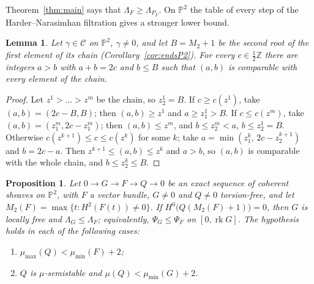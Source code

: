 \documentclass[11pt]{amsart}
\newtheorem{proposition}[theorem]{Proposition}
\newtheorem{lemma}[theorem]{Lemma}
\theoremstyle{definition}
\theoremstyle{remark}
\newcommand{\PP}{\mathbb{P}}
\newcommand{\ZZ}{\mathbb{Z}}
\newcommand{\CC}{\mathcal{C}}
\DeclareMathOperator{\rk}{rk}
\begin{document}
Theorem~\ref{thm:main} says that $\Lambda_F\ge\Lambda_{P_F}$. On $\PP^2$ the table of every step of the Harder--Narasimhan filtration gives a stronger lower bound.

\begin{lemma}\label{lem:lowpair}
Let $\gamma\in\CC$ on $\PP^2$, $\gamma\ne0$, and let $B=M_2+1$ be the second root of the first element of its chain (Corollary~\textup{\ref{cor:endsP2}}). For every $c\in\frac12\ZZ$ there are integers $a>b$ with $a+b=2c$ and $b\le B$ such that $(a,b)$ is comparable with every element of the chain.
\end{lemma}

\begin{proof}
Let $z^1>\dots>z^m$ be the chain, so $z^1_2=B$. If $c\ge c(z^1)$, take $(a,b)=(2c-B,B)$; then $(a,b)\ge z^1$ and $a\ge z^1_1>B$. If $c\le c(z^m)$, take $(a,b)=(z^m_1,2c-z^m_1)$; then $(a,b)\le z^m$, and $b\le z^m_2<a$, $b\le z^1_2=B$. Otherwise $c(z^{k+1})\le c\le c(z^k)$ for some $k$; take $a=\min(z^k_1,\,2c-z^{k+1}_2)$ and $b=2c-a$. Then $z^{k+1}\le(a,b)\le z^k$ and $a>b$, so $(a,b)$ is comparable with the whole chain, and $b\le z^k_2\le B$.
\end{proof}

\begin{proposition}\label{prop:Mcrit}
Let $0\to G\to F\to Q\to0$ be an exact sequence of coherent sheaves on $\PP^2$, with $F$ a vector bundle, $G\ne0$ and $Q\ne0$ torsion-free, and let $M_2(F)=\max\{t:H^2(F(t))\ne0\}$. If $H^0\big(Q(M_2(F)+1)\big)=0$, then $G$ is locally free and $\Lambda_G\le\Lambda_F$; equivalently, $\Psi_G\le\Psi_F$ on $[0,\rk G]$. The hypothesis holds in each of the following cases:
\begin{enumerate}[label=\textup{(\alph*)}]
\item $\mu_{\max}(Q)<\mu_{\min}(F)+2$;
\item $Q$ is $\mu$-semistable and $\mu(Q)<\mu_{\min}(G)+2$.
\end{enumerate}
\end{proposition}
\end{document}
